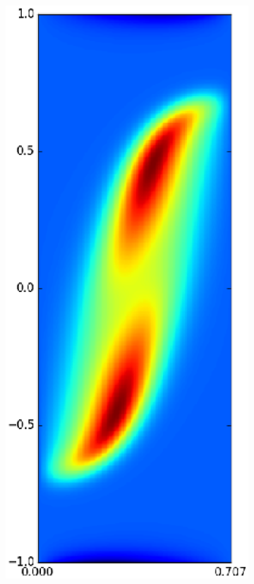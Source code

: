 \begin{figure}
\begin{subfigure}[b]{0.24\textwidth}
\end{subfigure}
\begin{subfigure}[b]{0.24\textwidth}
\includegraphics[width=\textwidth]{gfx/cnv_o16_e32-vorticity_yz-0033}

\end{subfigure}
\end{figure}

